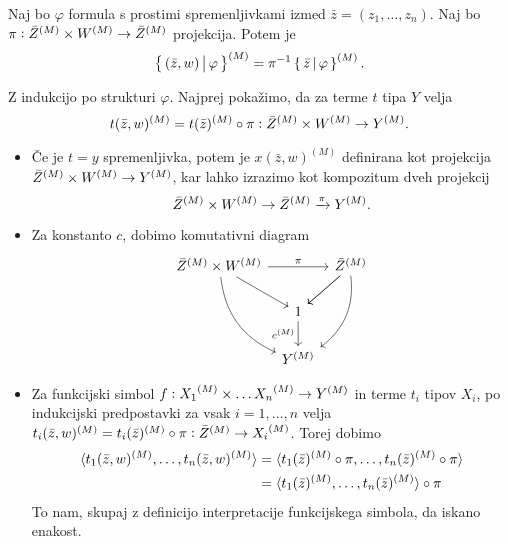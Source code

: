 \documentclass[../kategoricna_logika.tex]{subfiles}
\begin{document}
\begin{lema}
  Naj bo $\varphi$ formula s prostimi spremenljivkami izmed $\bar{z} = (z_1, \ldots, z_n)$.
  Naj bo $\pi : \bar{Z}^{(M)} \times W^{(M)} \to {\bar{Z}}^{(M)}$ projekcija. Potem je
  $$\left\lbrace\,(\bar{z}, w) \,\middle|\, \varphi\,\right\rbrace^{(M)} = \pi^{-1} \left\lbrace\,\bar{z} \,\middle|\, \varphi\,\right\rbrace^{(M)}.$$
\end{lema}
\begin{dokaz}
  Z indukcijo po strukturi $\varphi$.
  Najprej pokažimo, da za terme $t$ tipa $Y$ velja
  $$t(\bar{z}, w)^{(M)} = t(\bar{z})^{(M)} \circ \pi : {\bar{Z}}^{(M)} \times W^{(M)} \to {Y}^{(M)}.$$
  \begin{itemize}
    \item Če je $t = y$ spremenljivka, potem je $x(\bar{z},w)^{(M)}$ definirana kot projekcija
      ${\bar{Z}}^{(M)} \times {W}^{(M)} \to Y^{(M)}$, kar lahko izrazimo kot kompozitum dveh projekcij
      $${\bar{Z}}^{(M)} \times {W}^{(M)} \to \bar{Z}^{(M)} \xrightarrow{\pi} Y^{(M)}.$$

    \item Za konstanto $c$, dobimo komutativni diagram
      \begin{equation*}
      \begin{tikzcd}[column sep=tiny]
        \bar{Z}^{(M)} \times \interp{W} \ar[ddr, bend right] \ar[dr] \ar[rr, "\pi"] & & \bar{Z}^{(M)} \ar[dl] \ar[dl] \ar[ddl, bend left] \\
        & 1 \ar[d, "c^{(M)}"'] & \\
        & Y^{(M)} &
      \end{tikzcd}
      \end{equation*}
    
    \item Za funkcijski simbol $f : {X_1}^{(M)} \times \ldots {X_n}^{(M)} \to {Y}^{(M)}$
      in terme $t_i$ tipov $X_i$, po indukcijski predpostavki za vsak $i = 1, \ldots, n$ velja
      $t_i(\bar{z},w)^{(M)} = t_i(\bar{z})^{(M)} \circ \pi : {\bar{Z}}^{(M)} \to {X_i}^{(M)}$.
      Torej dobimo
      \begin{align*}
        \langle t_1(\bar{z}, w)^{(M)}, \ldots, t_n(\bar{z}, w)^{(M)} \rangle &= \langle t_1(\bar{z})^{(M)} \circ \pi, \ldots, t_n(\bar{z})^{(M)} \circ \pi \rangle \\
          &= \langle t_1(\bar{z})^{(M)}, \ldots, t_n(\bar{z})^{(M)} \rangle \circ \pi
      \end{align*}
      To nam, skupaj z definicijo interpretacije funkcijskega simbola, da iskano enakost.


\end{itemize}
\end{dokaz}
\end{document}
